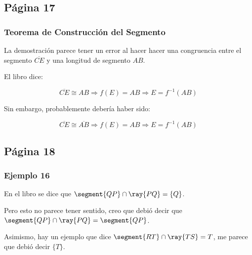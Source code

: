 


\subsection{Página 17}
\subsubsection{Teorema de Construcción del Segmento}

La demostración parece tener un error al hacer hacer una congruencia entre el segmento \(\overline{CE}\) y una longitud de segmento \(AB\).

El libro dice:

\[\overline{CE} \cong AB \Rightarrow f(E) = AB \Rightarrow E = f^{-1}(AB)\]

Sin embargo, probablemente debería haber sido:

\[\overline{CE} \cong \overline{AB} \Rightarrow f(E) = AB \Rightarrow E = f^{-1}(AB)\]

\subsection{Página 18}
\subsubsection{Ejemplo 16}

En el libro se dice que \(\segment{QP} \cap  \ray{PQ} = \left\{Q\right\}\).

Pero esto no parece tener sentido, creo que debió decir que \(\segment{QP} \cap \ray{PQ} = \segment{QP}\).

Asimismo, hay un ejemplo que dice \(\segment{RT} \cap \ray{TS} = T\), me parece que debió decir \(\{T\}\).


